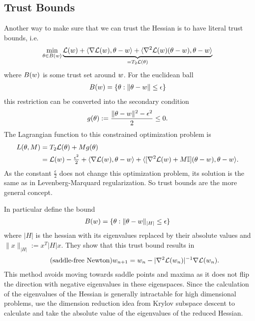 \subsection{Trust Bounds}\label{subsec: trust bounds}

Another way to make sure that we can trust the Hessian is to have literal trust
bounds, i.e.
\begin{align*}
	\min_{ \theta\in B(w) }
	\underbrace{
		\mathcal{L}(w)
		+ \langle \nabla\mathcal{L}(w), \theta-w\rangle
		+ \langle \nabla^2\mathcal{L}(w)(\theta-w), \theta-w\rangle
	}_{= T_2\mathcal{L}(\theta)}
\end{align*}
where \(B(w)\) is some trust set around \(w\). For the euclidean
ball
\begin{align*}
	B(w) = \{ \theta : \|\theta - w\| \le \epsilon\}
\end{align*}
this restriction can be converted into the secondary condition
\begin{align*}
	g(\theta) := \frac{\|\theta - w\|^2 - \epsilon^2}{2} \le 0.
\end{align*}
The Lagrangian function to this constrained optimization problem is
\begin{align*}
	L(\theta, M) 
	&= T_2\mathcal{L}(\theta) + M g(\theta)\\
	&= \mathcal{L}(w) -\tfrac{\epsilon^2}{2}
	+ \langle \nabla\mathcal{L}(w), \theta-w\rangle
	+ \langle [\nabla^2\mathcal{L}(w) + M\mathbb{I}](\theta-w), \theta-w\rangle.
\end{align*}
As the constant \(\frac{\epsilon}2\) does not change this optimization problem,
its solution is the same as in Levenberg-Marquard regularization. So trust
bounds are the more general concept.

In particular \textcite{dauphinIdentifyingAttackingSaddle2014} define the bound
\begin{align*}
	B(w) = \{ \theta : \|\theta-w\|_{|H|} \le \epsilon\}
\end{align*}
where \(|H|\) is the hessian with its eigenvalues replaced by their absolute values
and \(\|x\|_{|H|}:= x^T |H| x\). They show that this trust bound results in
\begin{align*}
	\tag{saddle-free Newton}
	w_{n+1}	= w_n - |\nabla^2\mathcal{L}(w_n)|^{-1}\nabla\mathcal{L}(w_n).
\end{align*}
This method avoids moving towards saddle points and maxima as it does not flip
the direction with negative eigenvalues in these eigenspaces. Since the
calculation of the eigenvalues of the Hessian is generally intractable for
high dimensional problems, \textcite{dauphinIdentifyingAttackingSaddle2014}
use the dimension reduction idea from Krylov subspace descent to calculate
and take the absolute value of the eigenvalues of the reduced Hessian.


